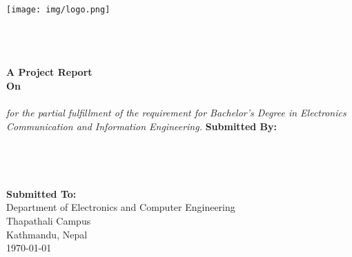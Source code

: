 \begin{titlepage}
   \begin{center}
   	\begin{spacing}{1.5}
   	\texttt{[image: img/logo.png]}   	  	

	\textbf{\MakeUppercase{\cUniversity}}\\
	\textbf{\MakeUppercase{\cDepartment} }\\
	\textbf{\MakeUppercase{\cCampus}} \\
	\vfill
	\textbf{A Project Report \\ On \\ }
	\textbf{\MakeUppercase{\cTitle}}\\
	\vfill
	\textit{for the partial fulfillment of the requirement for  Bachelor's Degree in Electronics Communication and Information Engineering.}
	\vfill
	\textbf{Submitted By:} \\
	\cSubmittedI \\
	\cSubmittedII \\
	\cSubmittedIII \\
	\cSubmittedIV \\
	\vfill
	\textbf{Submitted To:} \\
	Department of Electronics and Computer Engineering \\ Thapathali Campus \\ Kathmandu, Nepal\\ 
	\today \\
    \end{spacing}
    \end{center}
\end{titlepage}
